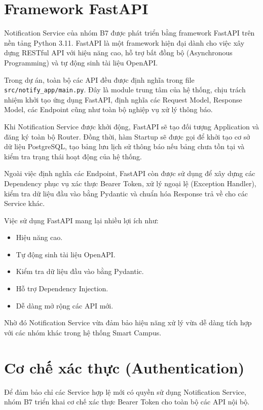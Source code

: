 \section{Framework FastAPI}

Notification Service của nhóm B7 được phát triển bằng framework FastAPI trên nền tảng Python 3.11. FastAPI là một framework hiện đại dành cho việc xây dựng RESTful API với hiệu năng cao, hỗ trợ bất đồng bộ (Asynchronous Programming) và tự động sinh tài liệu OpenAPI.

Trong dự án, toàn bộ các API đều được định nghĩa trong file \texttt{src/notify\_app/main.py}. Đây là module trung tâm của hệ thống, chịu trách nhiệm khởi tạo ứng dụng FastAPI, định nghĩa các Request Model, Response Model, các Endpoint cũng như toàn bộ nghiệp vụ xử lý thông báo.

Khi Notification Service được khởi động, FastAPI sẽ tạo đối tượng Application và đăng ký toàn bộ Router. Đồng thời, hàm Startup sẽ được gọi để khởi tạo cơ sở dữ liệu PostgreSQL, tạo bảng lưu lịch sử thông báo nếu bảng chưa tồn tại và kiểm tra trạng thái hoạt động của hệ thống.

Ngoài việc định nghĩa các Endpoint, FastAPI còn được sử dụng để xây dựng các Dependency phục vụ xác thực Bearer Token, xử lý ngoại lệ (Exception Handler), kiểm tra dữ liệu đầu vào bằng Pydantic và chuẩn hóa Response trả về cho các Service khác.

Việc sử dụng FastAPI mang lại nhiều lợi ích như:

\begin{itemize}
\item Hiệu năng cao.
\item Tự động sinh tài liệu OpenAPI.
\item Kiểm tra dữ liệu đầu vào bằng Pydantic.
\item Hỗ trợ Dependency Injection.
\item Dễ dàng mở rộng các API mới.
\end{itemize}

Nhờ đó Notification Service vừa đảm bảo hiệu năng xử lý vừa dễ dàng tích hợp với các nhóm khác trong hệ thống Smart Campus.


\section{Cơ chế xác thực (Authentication)}

Để đảm bảo chỉ các Service hợp lệ mới có quyền sử dụng Notification Service, nhóm B7 triển khai cơ chế xác thực Bearer Token cho toàn bộ các API nội bộ.

